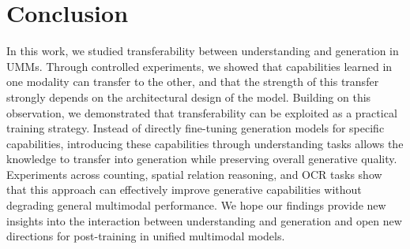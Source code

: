 \section{Conclusion}

In this work, we studied transferability between understanding and generation in UMMs. Through controlled experiments, we showed that capabilities learned in one modality can transfer to the other, and that the strength of this transfer strongly depends on the architectural design of the model. Building on this observation, we demonstrated that transferability can be exploited as a practical training strategy. Instead of directly fine-tuning generation models for specific capabilities, introducing these capabilities through understanding tasks allows the knowledge to transfer into generation while preserving overall generative quality. Experiments across counting, spatial relation reasoning, and OCR tasks show that this approach can effectively improve generative capabilities without degrading general multimodal performance. We hope our findings provide new insights into the interaction between understanding and generation and open new directions for post-training in unified multimodal models.

